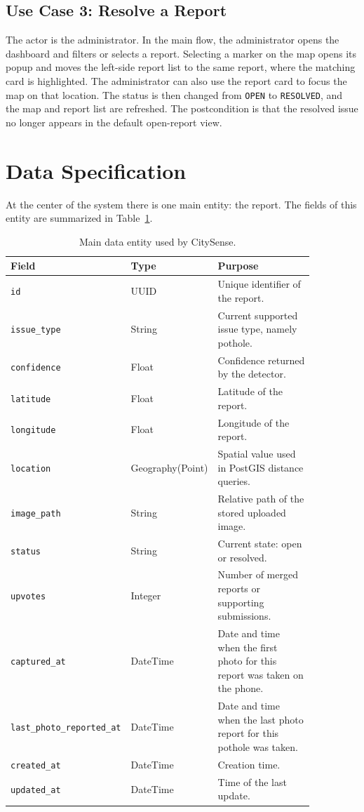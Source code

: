 \subsection{Use Case 3: Resolve a Report}

The actor is the administrator. In the main flow, the administrator opens the dashboard and filters or selects a report. Selecting a marker on the map opens its popup and moves the left-side report list to the same report, where the matching card is highlighted. The administrator can also use the report card to focus the map on that location. The status is then changed from \texttt{OPEN} to \texttt{RESOLVED}, and the map and report list are refreshed. The postcondition is that the resolved issue no longer appears in the default open-report view.

\section{Data Specification}

At the center of the system there is one main entity: the report. The fields of this entity are summarized in Table~\ref{tab:report_entity}.

\begin{table}[htbp]
\centering
\begin{tabular}{>{\raggedright\arraybackslash}p{0.30\linewidth} >{\raggedright\arraybackslash}p{0.24\linewidth} >{\raggedright\arraybackslash}p{0.32\linewidth}}
\toprule
\textbf{Field} & \textbf{Type} & \textbf{Purpose} \\
\midrule
\texttt{id} & UUID & Unique identifier of the report. \\
\texttt{issue\_type} & String & Current supported issue type, namely pothole. \\
\texttt{confidence} & Float & Confidence returned by the detector. \\
\texttt{latitude} & Float & Latitude of the report. \\
\texttt{longitude} & Float & Longitude of the report. \\
\texttt{location} & Geography(Point) & Spatial value used in PostGIS distance queries. \\
\texttt{image\_path} & String & Relative path of the stored uploaded image. \\
\texttt{status} & String & Current state: open or resolved. \\
\texttt{upvotes} & Integer & Number of merged reports or supporting submissions. \\
\texttt{captured\_at} & DateTime & Date and time when the first photo for this report was taken on the phone. \\
\texttt{last\_photo\_\allowbreak reported\_\allowbreak at} & DateTime & Date and time when the last photo report for this pothole was taken. \\
\texttt{created\_at} & DateTime & Creation time. \\
\texttt{updated\_at} & DateTime & Time of the last update. \\
\bottomrule
\end{tabular}
\caption{Main data entity used by CitySense.}
\label{tab:report_entity}
\end{table}

